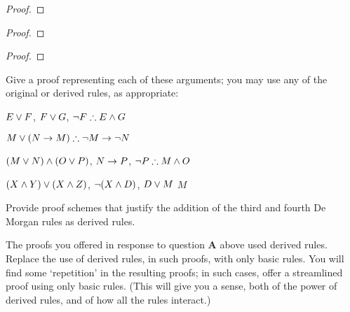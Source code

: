 \begin{multicols}{2}\noindent
\begin{proof}
\open
	 {}
		\open
	\close
\close
{}
\end{proof}

\begin{proof}
 {}
 {}
\end{proof}

\begin{proof}
\open
\close
{}
\end{proof}\end{multicols}


\newpage
\problempart 
Give a proof representing each of these arguments; you may use any of the original or derived rules, as appropriate:
\begin{earg}
\item $E\vee F$, $F\vee G$, $\neg F \mathrel{\therefore} E \wedge G$
\item $M\vee(N\rightarrow M) \mathrel{\therefore} \neg M \rightarrow \neg N$
\item $(M \vee N) \wedge (O \vee P)$, $N \rightarrow P$, $\neg P \mathrel{\therefore} M\wedge O$
\item $(X\wedge Y)\vee(X\wedge Z)$, $\neg(X\wedge D)$, $D\vee M$ \ttherefore $M$
\end{earg}


\problempart
Provide proof schemes that justify the addition of the third and fourth De Morgan rules as derived rules. 



\problempart
The proofs you offered in response to question \textbf{A} above used derived rules. Replace the use of derived rules, in such proofs, with only basic rules. You will find some `repetition' in the resulting proofs; in such cases, offer a streamlined proof using only basic rules.  (This will give you a sense, both of the power of derived rules, and of how all the rules interact.)

